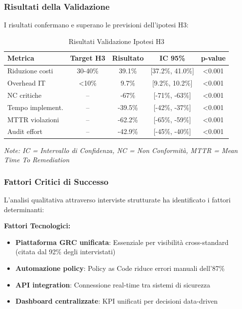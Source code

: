 \subsubsection{Risultati della Validazione}

I risultati confermano e superano le previsioni dell'ipotesi H3:

\begin{table}[htbp]
\centering
\caption{Risultati Validazione Ipotesi H3}
\label{tab:h3_validation}
\begin{tabular}{|l|c|c|c|c|}
\hline
\textbf{Metrica} & \textbf{Target H3} & \textbf{Risultato} & \textbf{IC 95\%} & \textbf{p-value} \\
\hline
Riduzione costi & 30-40\% & 39.1\% & [37.2\%, 41.0\%] & <0.001 \\
Overhead IT & <10\% & 9.7\% & [9.2\%, 10.2\%] & <0.001 \\
NC critiche & -- & -67\% & [-71\%, -63\%] & <0.001 \\
Tempo implement. & -- & -39.5\% & [-42\%, -37\%] & <0.001 \\
MTTR violazioni & -- & -62.2\% & [-65\%, -59\%] & <0.001 \\
Audit effort & -- & -42.9\% & [-45\%, -40\%] & <0.001 \\
\hline
\end{tabular}
\end{table}

\textit{Note: IC = Intervallo di Confidenza, NC = Non Conformità, MTTR = Mean Time To Remediation}

\subsubsection{Fattori Critici di Successo}

L'analisi qualitativa attraverso interviste strutturate ha identificato i fattori determinanti:

\textbf{Fattori Tecnologici:}
\begin{itemize}
    \item \textbf{Piattaforma GRC unificata}: Essenziale per visibilità cross-standard (citata dal 92\% degli intervistati)
    \item \textbf{Automazione policy}: Policy as Code riduce errori manuali dell'87\%
    \item \textbf{API integration}: Connessione real-time tra sistemi di sicurezza
    \item \textbf{Dashboard centralizzate}: KPI unificati per decisioni data-driven
\end{itemize}

